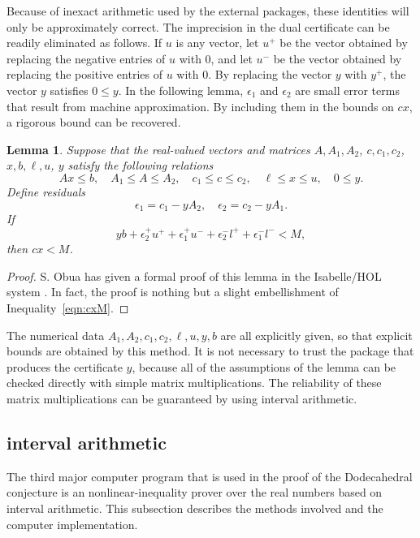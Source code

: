 \documentclass{article} %
\newtheorem{lemma}{Lemma}[subsection]
\begin{document}
Because of inexact arithmetic used by the external packages, 
these identities will only be
approximately correct.   The imprecision in the dual
certificate can be readily eliminated as follows. If $u$ is
any vector, let $u^+$ be the vector obtained by replacing the
negative entries of $u$ with $0$, and let $u^-$ be the vector
obtained by replacing the positive entries of $u$ with $0$.
By replacing the vector $y$ with $y^+$, the vector $y$ satisfies
$0\le y$.  In the following lemma, $\epsilon_1$ and $\epsilon_2$ are
small error terms that result from machine approximation.
By including them in the bounds on $c x$, a rigorous bound
can be recovered.


\begin{lemma}  Suppose that the real-valued vectors and matrices
$A,A_1,A_2$, $c,c_1,c_2$, $x,b,\ell,u$, $y$ satisfy the following
relations
  $$
  A x\le b, \quad A_1 \le A \le A_2,
  \quad c_1 \le c \le c_2,\quad \ell\le x\le u,\quad
  0\le y.
  $$
Define residuals
  $$
   \epsilon_1 = c_1 - y A_2,\quad \epsilon_2 = c_2  - y A_1.
  $$
If
$$
y b + \epsilon_2^+ u^+ + \epsilon_1^+ u^- + \epsilon_2^- l^+ + \epsilon_1^- l^- < M,
$$
then $c x < M$.
\end{lemma}

\begin{proof}  S. Obua has given a formal proof of this lemma in
the Isabelle/HOL system \cite[3.7.2]{Ob}.  In fact, the proof is
nothing but a slight
embellishment of Inequality~\ref{eqn:cxM}.
\end{proof}

The numerical data $A_1,A_2,c_1,c_2,\ell,u,y,b$ are all explicitly given,
so that explicit bounds are obtained by this
method.  It is not necessary to trust the package
that produces the certificate $y$, because
all of the assumptions of the lemma can be checked directly with
simple matrix multiplications.  The reliability of these matrix
multiplications can be guaranteed by using interval arithmetic.


\subsection{interval arithmetic}

The third major computer program that is used in the proof of
the Dodecahedral conjecture is an nonlinear-inequality prover
over the real numbers based on interval arithmetic.  
This subsection describes the
methods involved and the computer implementation.
\end{document}
